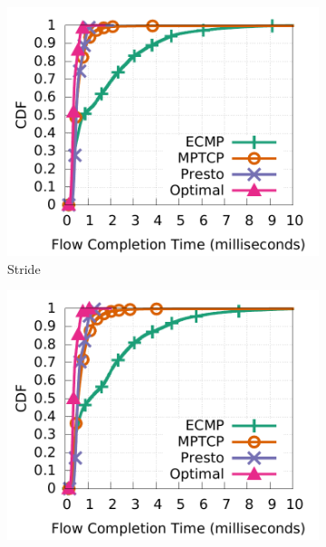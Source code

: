 \begin{figure}[!t]
        \centering
	\begin{subfigure}[b]{0.45\textwidth}
                \centering
  		\includegraphics[width=\textwidth]{presto/figures/macro/stride/macro_compare_fct_stride_mice.pdf}
        	\caption{Stride}
        	\label{macro_evaluation_fct_stride}
	\end{subfigure}
	\begin{subfigure}[b]{0.45\textwidth}
                \centering
		\includegraphics[width=\textwidth]{presto/figures/macro/bijection/macro_compare_fct_bijection_mice.pdf}

\end{subfigure}
\end{figure}
